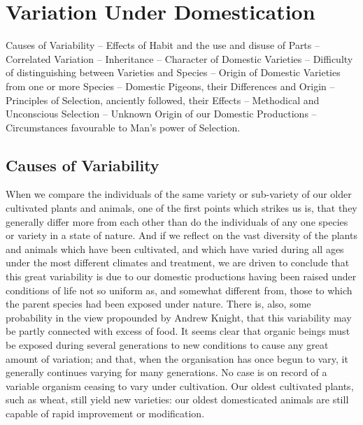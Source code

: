\chapter{Variation Under Domestication}
\minitoc

Causes of Variability -- Effects of Habit and the use and disuse
of Parts -- Correlated Variation -- Inheritance -- Character of
Domestic Varieties -- Difficulty of distinguishing between Varieties
and Species -- Origin of Domestic Varieties from one or more Species
-- Domestic Pigeons, their Differences and Origin -- Principles of
Selection, anciently followed, their Effects -- Methodical and
Unconscious Selection -- Unknown Origin of our Domestic Productions
-- Circumstances favourable to Man's power of Selection.


\section{Causes of Variability}
When we compare the individuals of the same variety or
sub-variety of our older cultivated plants and animals, one of the
first points which strikes us is, that they generally differ more
from each other than do the individuals of any one species or
variety in a state of nature. And if we reflect on the vast
diversity of the plants and animals which have been cultivated, and
which have varied during all ages under the most different climates
and treatment, we are driven to conclude that this great
variability is due to our domestic productions having been raised
under conditions of life not so uniform as, and somewhat different
from, those to which the parent species had been exposed under
nature. There is, also, some probability in the view propounded by
Andrew Knight, that this variability may be partly connected with
excess of food. It seems clear that organic beings must be exposed
during several generations to new conditions to cause any great
amount of variation; and that, when the organisation has once begun
to vary, it generally continues varying for many generations. No
case is on record of a variable organism ceasing to vary under
cultivation. Our oldest cultivated plants, such as wheat, still
yield new varieties: our oldest domesticated animals are still
capable of rapid improvement or modification.

